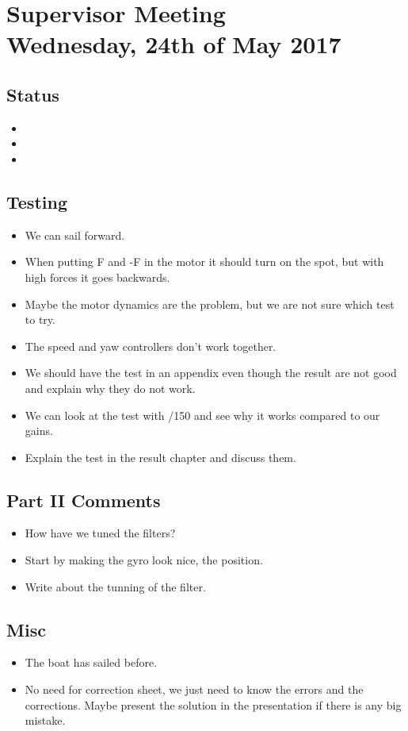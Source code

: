 
\renewcommand{\vec}[1]{\boldsymbol{\mathbf{#1}}}


\section*{Supervisor Meeting\\ \small Wednesday, 24th of May 2017}

\subsection{Status}
\begin{itemize}
    \item 
    \item 
    \item 
\end{itemize}

\subsection{Testing}
\begin{itemize}
    \item We can sail forward.
    \item When putting F and -F in the motor it should turn on the spot, but with high forces it goes backwards.
    \item Maybe the motor dynamics are the problem, but we are not sure which test to try.
    \item The speed and yaw controllers don't work together.
    \item We should have the test in an appendix even though the result are not good and explain why they do not work.
    \item We can look at the test with /150 and see why it works compared to our gains.
    \item Explain the test in the result chapter and discuss them.
\end{itemize}

\subsection{Part II Comments}
\begin{itemize}
    \item How have we tuned the filters? 
    \item Start by making the gyro look nice, the position.
    \item Write about the tunning of the filter.
\end{itemize} 

\subsection{Misc}
\begin{itemize}
    \item The boat has sailed before.
    \item No need for correction sheet, we just need to know the errors and the corrections. Maybe present the solution in the presentation if there is any big mistake.
\end{itemize}

